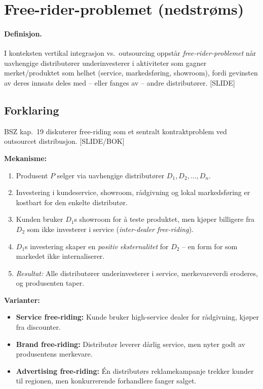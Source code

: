 \section{Free-rider-problemet (nedstrøms)}\label{thr:free-rider-problem}

\paragraph{Definisjon.} I konteksten vertikal integrasjon vs.\ outsourcing oppstår \emph{free-rider-problemet} når uavhengige distributører underinvesterer i aktiviteter som gagner merket/produktet som helhet (service, markedsføring, showroom), fordi gevinsten av deres innsats deles med -- eller fanges av -- andre distributører. [SLIDE]

\subsection*{Forklaring}

BSZ kap.\ 19 diskuterer free-riding som et sentralt kontraktproblem ved outsourcet distribusjon. [SLIDE/BOK]

\textbf{Mekanisme:}
\begin{enumerate}\setlength{\itemsep}{2pt}
\item Produsent $P$ selger via uavhengige distributører $D_1, D_2, \ldots, D_n$.
\item Investering i kundeservice, showroom, rådgivning og lokal markedsføring er kostbart for den enkelte distributør.
\item Kunden bruker $D_1$s showroom for å teste produktet, men kjøper billigere fra $D_2$ som ikke investerer i service (\emph{inter-dealer free-riding}).
\item $D_1$s investering skaper en \emph{positiv eksternalitet} for $D_2$ -- en form for  som markedet ikke internaliserer.
\item \emph{Resultat:} Alle distributører underinvesterer i service, merkevareverdi eroderes, og produsenten taper.
\end{enumerate}

\textbf{Varianter:}
\begin{itemize}\setlength{\itemsep}{1pt}
\item \textbf{Service free-riding:} Kunde bruker high-service dealer for rådgivning, kjøper fra discounter.
\item \textbf{Brand free-riding:} Distributør leverer dårlig service, men nyter godt av produsentens merkevare.
\item \textbf{Advertising free-riding:} Én distributørs reklamekampanje trekker kunder til regionen, men konkurrerende forhandlere fanger salget.
\end{itemize}

